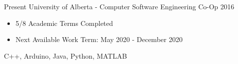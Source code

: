 
  

\begin{experiences}
    \experience
      {Present}   {University of Alberta - Computer Software Engineering Co-Op}{}{}
      {2016} {
                        \begin{itemize}
                          \item 5/8 Academic Terms Completed
                          \item Next Available Work Term: May 2020 - December 2020
                        \end{itemize}
                      }
                      {
                        C++,
                        Arduino,
                        Java,
                        Python,
                        MATLAB
                      }
  
  \end{experiences}